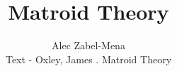 \documentclass[12pt]{book}
\date{}
\title{Matroid Theory}
\author{Alec Zabel-Mena \\ Text - Oxley, James . Matroid Theory}
\theoremstyle{plain}
\theoremstyle{definition}
\theoremstyle{remark}
\begin{document}
\maketitle



\nocite{*}



\end{document}
